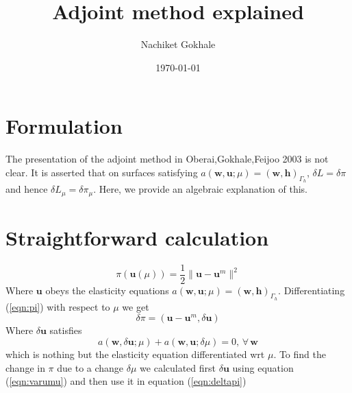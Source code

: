 \documentclass{article}
\newcommand{\beq}{\begin{equation}}
\newcommand{\eeq}{\end{equation}}
\begin{document}
\title{Adjoint method explained}
\author{Nachiket Gokhale}
\date{\today}
\maketitle
%
%
%
\section{Formulation}
The presentation of the adjoint method in Oberai,Gokhale,Feijoo 2003 is not clear. It is asserted that on surfaces satisfying $a(\pmb{w},\pmb{u};\mu)=(\pmb{w},\pmb{h})_{\Gamma_h}$, $\delta{L}=\delta{\pi}$ and hence $\delta{L}_{\mu}=\delta{\pi}_{\mu}$. Here, we provide an algebraic explanation of this.
%
%
%
\section{Straightforward calculation}
%
%
\beq
\label{eqn:pi}
\pi(\pmb{u}(\mu)) = \frac{1}{2}\|\pmb{u}-\pmb{u}^m\|^2
\eeq
%
Where $\pmb{u}$ obeys the elasticity equations $a(\pmb{w},\pmb{u};\mu)=(\pmb{w},\pmb{h})_{\Gamma_h}$. Differentiating (\ref{eqn:pi}) with respect to $\mu$ we get
%
\beq
\label{eqn:deltapi}
\delta{\pi} = (\pmb{u}-\pmb{u}^m,\delta{\pmb{u}})
\eeq
%
Where $\delta{\pmb{u}}$ satisfies
%
\beq
\label{eqn:varumu}
a(\pmb{w},\delta\pmb{u};\mu) + a(\pmb{w},\pmb{u};\delta\mu) = 0 ,\,\forall\,\pmb{w}
\eeq
%
which is nothing but the elasticity equation differentiated wrt $\mu$. To find the change in $\pi$ due to a change $\delta\mu$ we calculated first $\delta{\pmb{u}}$ using equation (\ref{eqn:varumu}) and then use it in equation (\ref{eqn:deltapi})
%
%
%
\end{document}

